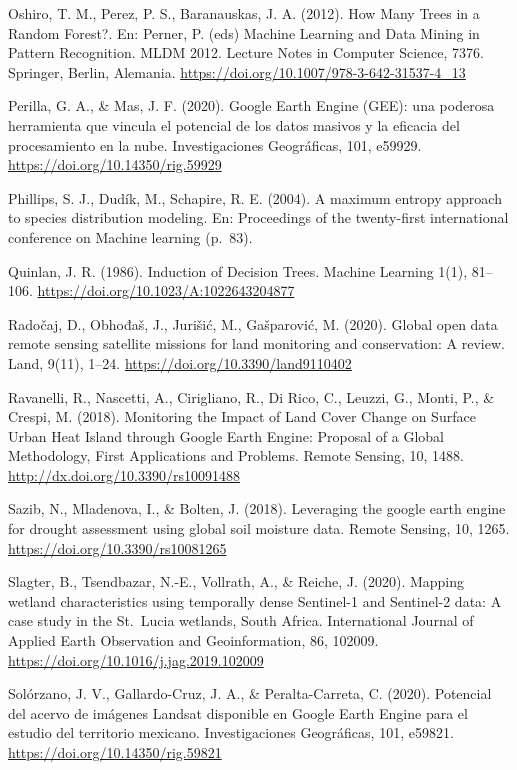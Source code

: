 \documentclass[
  12pt,
  letterpaper,
  twoside]{book}
\begin{document}
Oshiro, T. M., Perez, P. S., Baranauskas, J. A. (2012). How Many Trees in a Random Forest?. En: Perner, P. (eds) Machine Learning and Data Mining in Pattern Recognition. MLDM 2012. Lecture Notes in Computer Science, 7376. Springer, Berlin, Alemania. \url{https://doi.org/10.1007/978-3-642-31537-4_13}

Perilla, G. A., \& Mas, J. F. (2020). Google Earth Engine (GEE): una poderosa herramienta que vincula el potencial de los datos masivos y la eficacia del procesamiento en la nube. Investigaciones Geográficas, 101, e59929. \url{https://doi.org/10.14350/rig.59929}

Phillips, S. J., Dudík, M., Schapire, R. E. (2004). A maximum entropy approach to species distribution modeling. En: Proceedings of the twenty-first international conference on Machine learning (p.~83).

Quinlan, J. R. (1986). Induction of Decision Trees. Machine Learning 1(1), 81--106. \url{https://doi.org/10.1023/A:1022643204877}

Radočaj, D., Obhođaš, J., Jurišić, M., Gašparović, M. (2020). Global open data remote sensing satellite missions for land monitoring and conservation: A review. Land, 9(11), 1--24. \url{https://doi.org/10.3390/land9110402}

Ravanelli, R., Nascetti, A., Cirigliano, R., Di Rico, C., Leuzzi, G., Monti, P., \& Crespi, M. (2018). Monitoring the Impact of Land Cover Change on Surface Urban Heat Island through Google Earth Engine: Proposal of a Global Methodology, First Applications and Problems. Remote Sensing, 10, 1488. \url{http://dx.doi.org/10.3390/rs10091488}

Sazib, N., Mladenova, I., \& Bolten, J. (2018). Leveraging the google earth engine for drought assessment using global soil moisture data. Remote Sensing, 10, 1265. \url{https://doi.org/10.3390/rs10081265}

Slagter, B., Tsendbazar, N.-E., Vollrath, A., \& Reiche, J. (2020). Mapping wetland characteristics using temporally dense Sentinel-1 and Sentinel-2 data: A case study in the St.~Lucia wetlands, South Africa. International Journal of Applied Earth Observation and Geoinformation, 86, 102009. \url{https://doi.org/10.1016/j.jag.2019.102009}

Solórzano, J. V., Gallardo-Cruz, J. A., \& Peralta-Carreta, C. (2020). Potencial del acervo de imágenes Landsat disponible en Google Earth Engine para el estudio del territorio mexicano. Investigaciones Geográficas, 101, e59821. \url{https://doi.org/10.14350/rig.59821}
\end{document}
